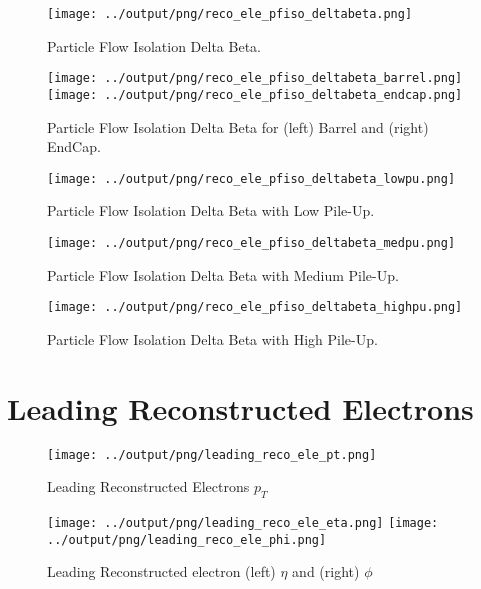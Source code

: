 \documentclass[11pt]{book}
\begin{document}
\begin{figure}[ht]
\centering
\texttt{[image: ../output/png/reco\_ele\_pfiso\_deltabeta.png]}
\caption{Particle Flow Isolation Delta Beta.}
\label{fig:reco_ele_pfiso_deltabeta}
\end{figure}

\begin{figure}[ht]
\centering
\texttt{[image: ../output/png/reco\_ele\_pfiso\_deltabeta\_barrel.png]}
\texttt{[image: ../output/png/reco\_ele\_pfiso\_deltabeta\_endcap.png]}
\caption{Particle Flow Isolation Delta Beta for (left) Barrel and (right) EndCap.}
\label{fig:reco_ele_pfiso_deltabeta_regions}
\end{figure}

\begin{figure}[ht]
\centering
\texttt{[image: ../output/png/reco\_ele\_pfiso\_deltabeta\_lowpu.png]}
\caption{Particle Flow Isolation Delta Beta with Low Pile-Up.}
\label{fig:reco_ele_pfiso_deltabeta_lowpu}
\end{figure}

\begin{figure}[ht]
\centering
\texttt{[image: ../output/png/reco\_ele\_pfiso\_deltabeta\_medpu.png]}
\caption{Particle Flow Isolation Delta Beta with Medium Pile-Up.}
\label{fig:reco_ele_pfiso_deltabeta_medpu}
\end{figure}

\begin{figure}[ht]
\centering
\texttt{[image: ../output/png/reco\_ele\_pfiso\_deltabeta\_highpu.png]}
\caption{Particle Flow Isolation Delta Beta with High Pile-Up.}
\label{fig:reco_ele_pfiso_deltabeta_highpu}
\end{figure}
\clearpage

\section{Leading Reconstructed Electrons}

\begin{figure}[ht]
\centering
\texttt{[image: ../output/png/leading\_reco\_ele\_pt.png]}
\caption{Leading Reconstructed Electrons $p_{T}$}
\label{fig:leading_reco_ele_pt}
\end{figure}

\begin{figure}[ht]
\centering
\texttt{[image: ../output/png/leading\_reco\_ele\_eta.png]}
\texttt{[image: ../output/png/leading\_reco\_ele\_phi.png]}
\caption{Leading Reconstructed electron (left) $\eta$ and (right) $\phi$}
\label{fig:leading_reco_ele_eta_phi}
\end{figure}
\clearpage



 
\end{document}
